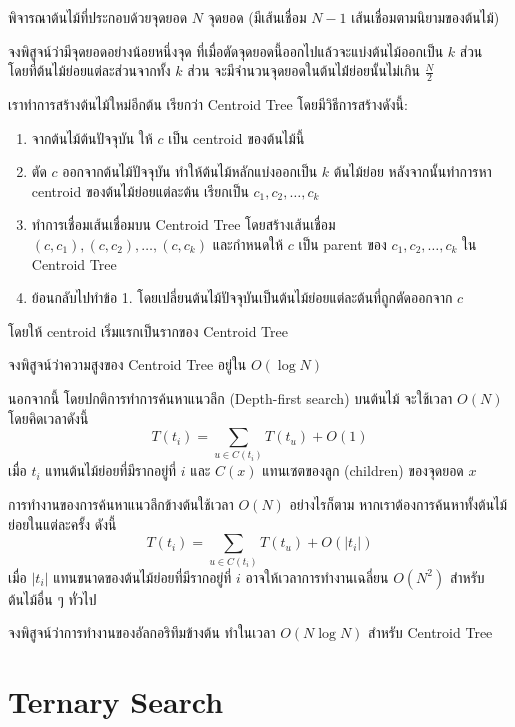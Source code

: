 พิจารณาต้นไม้ที่ประกอบด้วยจุดยอด $N$ จุดยอด (มีเส้นเชื่อม $N-1$ เส้นเชื่อมตามนิยามของต้นไม้)

\begin{exercise}
จงพิสูจน์ว่ามีจุดยอดอย่างน้อยหนึ่งจุด ที่เมื่อตัดจุดยอดนี้ออกไปแล้วจะแบ่งต้นไม้ออกเป็น $k$ ส่วน โดยที่ต้นไม้ย่อยแต่ละส่วนจากทั้ง $k$ ส่วน จะมีจำนวนจุดยอดในต้นไม่้ย่อยนั้นไม่เกิน $\frac{N}{2}$
\end{exercise}

เราทำการสร้างต้นไม้ใหม่อีกต้น เรียกว่า Centroid Tree โดยมีวิธีการสร้างดังนี้:

\begin{enumerate}[nosep]
    \item จากต้นไม้ต้นปัจจุบัน ให้ $c$ เป็น centroid ของต้นไม้นี้
    \item ตัด $c$ ออกจากต้นไม้ปัจจุบัน ทำให้ต้นไม้หลักแบ่งออกเป็น $k$ ต้นไม้ย่อย หลังจากนั้นทำการหา centroid ของต้นไม้ย่อยแต่ละต้น เรียกเป็น $c_1, c_2, \dots, c_k$
    \item ทำการเชื่อมเส้นเชื่อมบน Centroid Tree โดยสร้างเส้นเชื่อม $(c, c_1), (c, c_2), \dots, (c, c_k)$ และกำหนดให้ $c$ เป็น parent ของ $c_1, c_2, \dots, c_k$ ใน Centroid Tree
    \item ย้อนกลับไปทำข้อ 1. โดยเปลี่ยนต้นไม้ปัจจุบันเป็นต้นไม้ย่อยแต่ละต้นที่ถูกตัดออกจาก $c$
\end{enumerate}

โดยให้ centroid เริ่มแรกเป็นรากของ Centroid Tree

\begin{exercise}
จงพิสูจน์ว่าความสูงของ Centroid Tree อยู่ใน $O(\log N)$
\end{exercise}

นอกจากนี้ โดยปกติการทำการค้นหาแนวลึก (Depth-first search) บนต้นไม้ จะใช้เวลา $O(N)$ โดยคิดเวลาดังนี้
\[
T(t_i) = \sum_{u \in C(t_i)} T(t_u) + O(1)
\]
เมื่อ $t_i$ แทนต้นไม้ย่อยที่มีรากอยู่ที่ $i$ และ $C(x)$ แทนเซตของลูก (children) ของจุดยอด $x$

การทำงานของการค้นหาแนวลึกข้างต้นใช้เวลา $O(N)$ อย่างไรก็ตาม หากเราต้องการค้นหาทั้งต้นไม้ย่อยในแต่ละครั้ง ดังนี้
\[
T(t_i) = \sum_{u \in C(t_i)} T(t_u) + O(|t_i|)
\]
เมื่อ $|t_i|$ แทนขนาดของต้นไม้ย่อยที่มีรากอยู่ที่ $i$ อาจให้เวลาการทำงานเฉลี่ยน $O(N^2)$ สำหรับต้นไม้อื่น ๆ ทั่วไป

\begin{exercise}
จงพิสูจน์ว่าการทำงานของอัลกอริทึมข้างต้น ทำในเวลา $O(N \log N)$ สำหรับ Centroid Tree
\end{exercise}

\section{Ternary Search}

